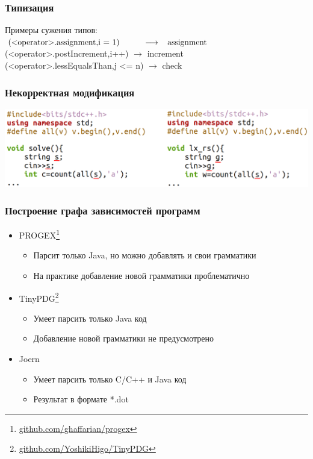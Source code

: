 \documentclass[10pt]{beamer}
\begin{document}
\begin{frame}\frametitle{Типизация}
	Примеры сужения типов:\\
	$\text{(<operator>.assignment,i = 1)}\hspace{1cm} \longrightarrow \hspace{0.3cm}\text{assignment}$\\
	(<operator>.postIncrement,i++)\hspace{0.6cm} $\longrightarrow$ \hspace{0.3cm}increment\\
	(<operator>.lessEqualsThan,j <= n) $\longrightarrow$\hspace{0.3cm} check
\end{frame}

\begin{frame}[fragile]\frametitle{Некорректная модификация}
	\centering
	\hspace*{-0.5cm}\includegraphics[scale=0.48]{bad_mod.png}
\end{frame}

\begin{frame}\frametitle{Построение графа зависимостей программ}
	\begin{itemize}
		\item PROGEX\footnote[11,frame]{\href{https://github.com/ghaffarian/progex}{\color{blue}github.com/ghaffarian/progex}}
		\begin{itemize}
			\item Парсит только Java, но можно добавлять и свои грамматики
			\item На практике добавление новой грамматики проблематично
		\end{itemize}
		\item TinyPDG\footnote[12,frame]{\href{https://github.com/YoshikiHigo/TinyPDG}{\color{blue}github.com/YoshikiHigo/TinyPDG}}
		\begin{itemize}
			\item Умеет парсить только Java код
			\item Добавление новой грамматики не предусмотрено
		\end{itemize}
		\item Joern
		\begin{itemize}
			\item Умеет парсить только C/C++ и Java код
			\item Результат в формате *.dot
		\end{itemize}
	\end{itemize}
\end{frame}
\end{document}

